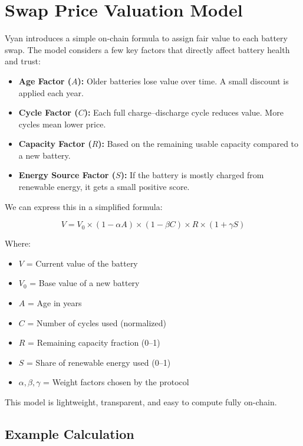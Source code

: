 \documentclass[12pt,a4paper]{article}
\begin{document}
\section{Swap Price Valuation Model}
Vyan introduces a simple on-chain formula to assign fair value to each battery swap.  
The model considers a few key factors that directly affect battery health and trust:

\begin{itemize}[leftmargin=1.5em]
    \item \textbf{Age Factor ($A$):} Older batteries lose value over time. A small discount is applied each year.
    \item \textbf{Cycle Factor ($C$):} Each full charge–discharge cycle reduces value. More cycles mean lower price.
    \item \textbf{Capacity Factor ($R$):} Based on the remaining usable capacity compared to a new battery.
    \item \textbf{Energy Source Factor ($S$):} If the battery is mostly charged from renewable energy, it gets a small positive score.
\end{itemize}

We can express this in a simplified formula:

\[
V = V_{0} \times (1 - \alpha A) \times (1 - \beta C) \times R \times (1 + \gamma S)
\]

Where:
\begin{itemize}[leftmargin=1.5em]
    \item $V$ = Current value of the battery  
    \item $V_{0}$ = Base value of a new battery  
    \item $A$ = Age in years  
    \item $C$ = Number of cycles used (normalized)  
    \item $R$ = Remaining capacity fraction (0–1)  
    \item $S$ = Share of renewable energy used (0–1)  
    \item $\alpha, \beta, \gamma$ = Weight factors chosen by the protocol  
\end{itemize}

This model is lightweight, transparent, and easy to compute fully on-chain. 

\subsection{Example Calculation}
\end{document}
